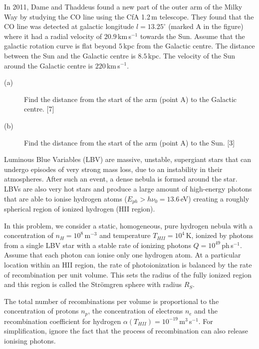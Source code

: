 In 2011, Dame and Thaddeus found a new part of the outer arm of the Milky Way by
studying the CO line using the CfA 1.2\,m telescope. They found that the CO line
was detected at galactic longitude $l = 13.25^\circ$ (marked A in the figure)
where it had a radial velocity of $20.9$\,km\,s$^{-1}$ towards the Sun. Assume
that the galactic rotation curve is flat beyond $5$\,kpc from the Galactic
centre. The distance between the Sun and the Galactic centre is $8.5$\,kpc. The
velocity of the Sun around the Galactic centre is $220$\,km\,s$^{-1}$.

\begin{description}
\item[(a)] Find the distance from the start of the arm (point A) to the Galactic
  centre. \hfill[7]
\item[(b)] Find the distance from the start of the arm (point A) to the Sun.
  \hfill[3]
\end{description}

Luminous Blue Variables (LBV) are massive, unstable, supergiant stars that can
undergo episodes of very strong mass loss, due to an instability in their
atmospheres. After such an event, a dense nebula is formed around the star. LBVs
are also very hot stars and produce a large amount of high-energy photons that
are able to ionise hydrogen atoms ($E_{ph} > h\nu_0 = 13.6$\,eV) creating a
roughly spherical region of ionized hydrogen (HII region).

In this problem, we consider a static, homogeneous, pure hydrogen nebula with a
concentration of $n_H = 10^{8}$\,m$^{-3}$ and temperature
$T_{HII} = 10^{4}$\,K, ionized by photons from a single LBV star with a stable
rate of ionizing photons $Q = 10^{49}$\,ph\,s$^{-1}$. Assume that each photon
can ionise only one hydrogen atom. At a particular location within an HII region,
the rate of photoionization is balanced by the rate of recombination per unit
volume. This sets the radius of the fully ionized region and this region is
called the Str\"omgren sphere with radius $R_S$.

The total number of recombinations per volume is proportional to the
concentration of protons $n_p$, the concentration of electrons $n_e$ and the
recombination coefficient for hydrogen
$\alpha(T_{HII}) = 10^{-19}$\,m$^3$\,s$^{-1}$. For simplification, ignore the
fact that the process of recombination can also release ionising photons.

